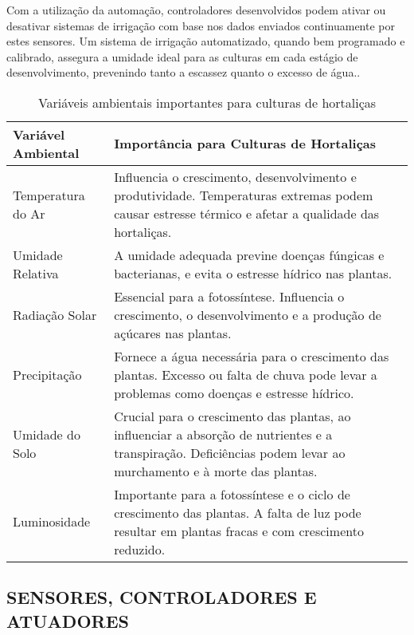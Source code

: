 \documentclass[%
  article,%
  a4paper,%
  12pt,%
  fleqn,%
  oneside,%
  chapter = TITLE,%
  section = TITLE,%
]{abntex2}
\begin{document}
 Com a utilização da automação, controladores desenvolvidos podem ativar ou desativar sistemas de irrigação com base nos dados enviados continuamente por estes sensores. Um sistema de irrigação automatizado, quando bem programado e calibrado, assegura a umidade ideal para as culturas em cada estágio de desenvolvimento, prevenindo tanto a escassez quanto o excesso de água.\cite{coelho2003desenvolvimento}.

\begin{table}[!htb]
\renewcommand{\tablename}{Quadro}
\captionsetup{justification=raggedright,singlelinecheck=false}
    \caption{Variáveis ambientais importantes para culturas de hortaliças}
    \centering
    \begin{tabular}{| m{4cm} | m{10cm} |}
        \hline
        \textbf{Variável Ambiental} & \textbf{Importância para Culturas de Hortaliças} \\
        \hline
        Temperatura do Ar & Influencia o crescimento, desenvolvimento e produtividade. Temperaturas extremas podem causar estresse térmico e afetar a qualidade das hortaliças. \\
        \hline
        Umidade Relativa  & A umidade adequada previne doenças fúngicas e bacterianas, e evita o estresse hídrico nas plantas. \\
        \hline
        Radiação Solar & Essencial para a fotossíntese. Influencia o crescimento, o desenvolvimento e a produção de açúcares nas plantas. \\
        \hline
        Precipitação & Fornece a água necessária para o crescimento das plantas. Excesso ou falta de chuva pode levar a problemas como doenças e estresse hídrico. \\
        \hline
        Umidade do Solo & Crucial para o crescimento das plantas, ao influenciar a absorção de nutrientes e a transpiração. Deficiências podem levar ao murchamento e à morte das plantas. \\
       \hline
        Luminosidade & Importante para a fotossíntese e o ciclo de crescimento das plantas. A falta de luz pode resultar em plantas fracas e com crescimento reduzido. \\
        \hline
    \end{tabular}
    \label{tab:variaveis_ambientais}
\end{table}


\subsection{SENSORES, CONTROLADORES E ATUADORES }
\end{document}
